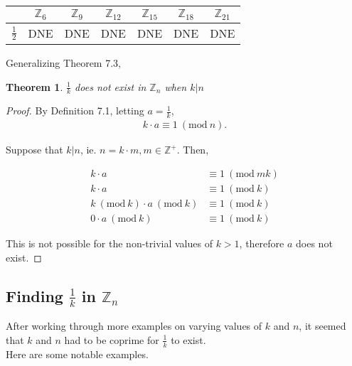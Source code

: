 \documentclass[12pt]{article}
\newcommand{\bZ}{{\mathbb{Z}}}
\newcommand{\Mod}[1]{\ (\mathrm{mod}\ #1)}
\newtheorem{theorem}{Theorem}[section]
\begin{document}
		\begin{table}[h!]
			\centering
			\begin{tabular}{c|c|c|c|c|c|c}
				& $\bZ_6$ & $\bZ_9$ & $\bZ_{12}$ & $\bZ_{15}$ & $\bZ_{18}$ & $\bZ_{21}$ \\
				\hline
				\hline
				$\frac{1}{2}$ & DNE & DNE & DNE & DNE & DNE & DNE
			\end{tabular}
		\end{table}

		Generalizing Theorem 7.3,

		\begin{theorem}
			$\frac{1}{k}$ does not exist in $\bZ_n$ when $k | n$
		\end{theorem}

		\begin{proof}
			By Definition 7.1, letting $a = \frac{1}{k}$,
			\begin{align*}
				k \cdot a \equiv 1 \Mod{n}.
			\end{align*}

			Suppose that $k|n$, ie. $n = k \cdot m, m \in \bZ^+$. Then,

			\begin{align*}
				k \cdot a &\equiv 1 \Mod{mk}\\
				k \cdot a &\equiv 1 \Mod{k}\\
				k \Mod{k} \cdot a \Mod{k} &\equiv 1 \Mod{k}\\
				0 \cdot a \Mod{k} &\equiv 1 \Mod{k}
			\end{align*}

			This is not possible for the non-trivial values of $k>1$, therefore $a$ does not exist.
		\end{proof}

\pagebreak

	\subsection{Finding $\frac{1}{k}$ in $\bZ_n$}

		After working through more examples on varying values of $k$ and $n$, it seemed that $k$ and $n$ had to be coprime for $\frac{1}{k}$ to exist.\\

		Here are some notable examples.
\end{document}
